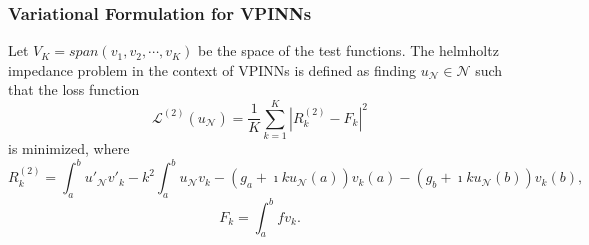 \subsubsection{Variational Formulation for VPINNs}\label{sec:vpinnsformulation}
Let $V_K = span(v_1, v_2, \cdots, v_K)$ be the space of the test functions. The helmholtz impedance problem in the context of VPINNs is defined as finding $u_{\mathcal{N}} \in \mathcal{N}$ such that the loss function
\begin{equation}
    \label{eq:lossfunction}
    \mathcal{L}^{(2)}(u_{\mathcal{N}}) = \frac{1}{K} \sum_{k=1}^{K}{|R_k^{(2)} - F_k|^2}
\end{equation}
is minimized, where
\begin{equation}
    \label{eq:vpinnlhs}
    R_k^{(2)} = \int_{a}^{b}{u'_{\mathcal{N}}v'_k} - k^2 \int_{a}^{b}{u_{\mathcal{N}}v_k} - (g_a + \imath ku_{\mathcal{N}}(a))v_k(a) - (g_b + \imath ku_{\mathcal{N}}(b))v_k(b),
\end{equation}
\begin{equation}
    \label{eq:vpinnrhs}
    F_k = \int_{a}^{b}{fv_k}.
\end{equation}

